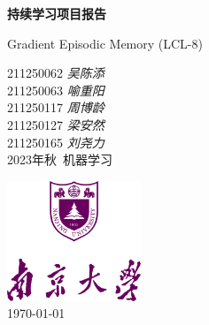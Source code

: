 \begin{titlepage}
    \begin{center}
        \vspace*{2.7cm}
            
        \Huge
        \textbf{持续学习项目报告}
        
        \vspace{1cm}
        \huge
        Gradient Episodic Memory (LCL-8)
        \vspace{1.5cm}
        \Large
            
        {211250062 \textit{吴陈添}\\
        211250063 \textit{喻重阳}\\
        211250117 \textit{周博龄}\\
        211250127 \textit{梁安然}\\
        211250165 \textit{刘尧力}\\}
        \vfill
        2023年秋\ 机器学习
        \vspace{1cm}  
    
        \includegraphics[width=0.3\textwidth]{templates/img/logo-nju.png}\\
        \vspace{1cm}  
        \Large \today
        
    \end{center}
\end{titlepage}
